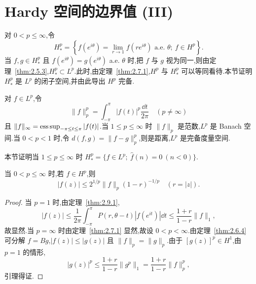 \section{Hardy 空间的边界值 (III)}\label{sec:2.10}

对 $0 < p \leq \infty$,令
\begin{equation*}
H_{*}^{p} = \left\{f(e^{i\theta}) = \lim_{r \to 1}f(re^{i\theta}) \text{ a.e. } \theta;\ f \in H^{p}\right\}.
\end{equation*}
当 $f, g \in H_{*}^{p}$ 且 $f(e^{i\theta}) = g(e^{i\theta})$ a.e. $\theta$ 时,把 $f$ 与 $g$ 视为同一,则由定理~\ref{thm:2.5.3},$H_{*}^{p} \subset L^{p}$.此时,由定理~\ref{thm:2.7.1},$H^{p}$ 与 $H_{*}^{p}$ 可以等同看待.本节证明 $H_{*}^{p}$ 是 $L^{p}$ 的闭子空间,并由此导出 $H^{p}$ 完备.

对 $f \in L^{p}$,令
\begin{equation*}
\|f\|_{p}^{p} = \int_{-\pi}^{\pi}|f(t)|^{p}\frac{\dd t}{2\pi} \quad (p \neq \infty)
\end{equation*}
且 $\|f\|_{\infty} = \operatorname{ess\,sup}_{-\pi \leq t \leq \pi}|f(t)|$.当 $1 \leq p \leq \infty$ 时 $\|f\|_{p}$ 是范数,$L^{p}$ 是 Banach 空间.当 $0 < p < 1$ 时,令 $d(f, g) = \|f - g\|_{p}^{p}$,则是距离,$L^{p}$ 是完备度量空间.

本节证明当 $1 \leq p \leq \infty$ 时 $H_{*}^{p} = \{f \in L^{p};\ \hat{f}(n) = 0 \ (n < 0)\}$.

\begin{lemma}\label{lem:2.10.1}
当 $0 < p \leq \infty$ 时,若 $f \in H^{p}$,则
\begin{equation*}
|f(z)| \leq 2^{1/p}\|f\|_{p}(1 - r)^{-1/p} \quad (r = |z|).
\end{equation*}
\end{lemma}

\begin{proof}
当 $p = 1$ 时,由定理~\ref{thm:2.9.1},
\begin{equation*}
|f(z)| \leq \frac{1}{2\pi}\int_{-\pi}^{\pi}P(r, \theta - t)|f(e^{it})|\dd t \leq \frac{1 + r}{1 - r}\|f\|_{1},
\end{equation*}
故显然.当 $p = \infty$ 时由定理~\ref{thm:2.7.1} 显然,故设 $0 < p < \infty$.由定理~\ref{thm:2.6.4} 可分解 $f = Bg$,$|f(z)| \leq |g(z)|$ 且 $\|f\|_{p} = \|g\|_{p}$.由于 $[g(z)]^{p} \in H^{1}$,由 $p = 1$ 的情形,
\begin{equation*}
|g(z)|^{p} \leq \frac{1 + r}{1 - r}\|g^{p}\|_{1} = \frac{1 + r}{1 - r}\|f\|_{p}^{p},
\end{equation*}
引理得证.
\end{proof}

